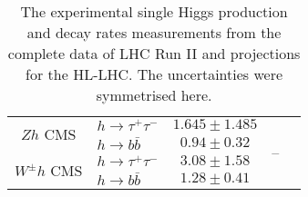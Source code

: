 \begin{table}[htb!]
{{\begin{tabular}{clccc}
\midrule
\midrule
\multirow{2}{*}{ \normalsize $Zh$ { \scriptsize {\color{Mahogany} CMS     }   }}    & $h\to \tau^+\tau^- $ & $1.645 \pm 1.485$&\multirow{5}{*}{--} &\multirow{5}{*}{ \cite{CMS:2020gsy} }  \\
& $h\to  b \bar b$       &$0.94 \pm 0.32$&&\\                         
 \cmidrule(r){2-3}    
\multirow{2}{*}{ \normalsize $W^\pm h${ \scriptsize {\color{Mahogany} CMS     }   }}           & $h\to \tau^+\tau^- $ &$3.08 \pm 1.58$&&\\
& $h\to  b \bar b$      & $1.28 \pm 0.41$&&\\                  
\midrule
\midrule
\end{tabular}
}
}
\caption{The experimental single Higgs production and decay rates measurements from the  complete  data of LHC Run II and projections for the HL-LHC. The uncertainties were symmetrised here.  }
\label{table:resHiggsExp}
\end{table}